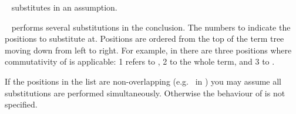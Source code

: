 \begin{isabellebody}
\begin{isamarkuptext}
\begin{description}
  \item \hyperlink{method.subst}{\mbox{}}~ substitutes in an
  assumption.

  \item \hyperlink{method.subst}{\mbox{}}~ performs several
  substitutions in the conclusion. The numbers  to 
  indicate the positions to substitute at.  Positions are ordered from
  the top of the term tree moving down from left to right. For
  example, in  there are three positions
  where commutativity of  is applicable: 1 refers to , 2 to the whole term, and 3 to .

  If the positions in the list  are non-overlapping
  (e.g.\  in ) you may
  assume all substitutions are performed simultaneously.  Otherwise
  the behaviour of  is not specified.


\end{description}
\end{isamarkuptext}
\end{isabellebody}
